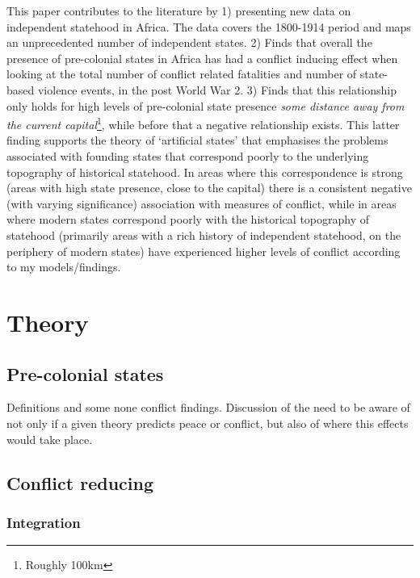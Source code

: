 \documentclass[12pt]{article}
\begin{document}
This paper contributes to the literature by 1) presenting new data on
independent statehood in Africa. The data covers the 1800-1914 period and maps
an unprecedented number of independent states. 2) Finds that overall the
presence of pre-colonial states in Africa has had a conflict inducing effect
when looking at the total number of conflict related fatalities and number of
state-based violence events, in the post World War 2. 3) Finds that this
relationship only holds for high levels of pre-colonial state presence
\textit{some distance away from the current capital}\footnote{Roughly 100km},
while before that a negative relationship exists. This latter finding supports
the theory of `artificial states' that emphasises the problems associated with
founding states that correspond poorly to the underlying topography of
historical statehood. In areas where this correspondence is strong (areas with
high state presence, close to the capital) there is a consistent negative (with
varying significance) association with measures of conflict, while in areas
where modern states correspond poorly with the historical topography of
statehood (primarily areas with a rich history of independent statehood, on the
periphery of modern states) have experienced higher levels of conflict according
to my models/findings.

\section{Theory}

\subsection{Pre-colonial states}

Definitions and some none conflict findings. Discussion of the need to be aware
of not only if a given theory predicts peace or conflict, but also of where this
effects would take place.

\subsection{Conflict reducing}

\subsubsection{Integration}
\end{document}

